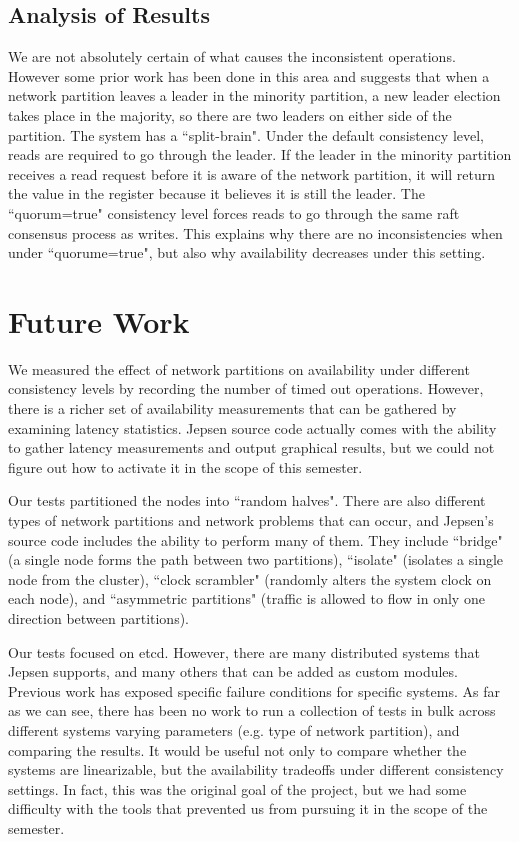 \documentclass[12pt,conference]{IEEEtran}
\begin{document}
\subsection{Analysis of Results}

We are not absolutely certain of what causes the inconsistent operations. However some prior work\cite{jepsenetcd} has been done in this area and suggests that when a network partition leaves a leader in the minority partition, a new leader election takes place in the majority, so there are two leaders on either side of the partition. The system has a ``split-brain". Under the default consistency level, reads are required to go through the leader. If the leader in the minority partition receives a read request before it is aware of the network partition, it will return the value in the register because it believes it is still the leader. The ``quorum=true" consistency level forces reads to go through the same raft consensus process as writes. This explains why there are no inconsistencies when under ``quorume=true", but also why availability decreases under this setting.

\section{Future Work}

We measured the effect of network partitions on availability under different consistency levels by recording the number of timed out operations. However, there is a richer set of availability measurements that can be gathered by examining latency statistics. Jepsen source code actually comes with the ability to gather latency measurements and output graphical results, but we could not figure out how to activate it in the scope of this semester.

Our tests partitioned the nodes into ``random halves". There are also different types of network partitions and network problems that can occur, and Jepsen's source code includes the ability to perform many of them. They include ``bridge" (a single node forms the path between two partitions), ``isolate" (isolates a single node from the cluster), ``clock scrambler" (randomly alters the system clock on each node), and ``asymmetric partitions" (traffic is allowed to flow in only one direction between partitions).

Our tests focused on etcd. However, there are many distributed systems that Jepsen supports, and many others that can be added as custom modules. Previous work has exposed specific failure conditions for specific systems. As far as we can see, there has been no work to run a collection of tests in bulk across different systems varying parameters (e.g. type of network partition), and comparing the results. It would be useful not only to compare whether the systems are linearizable, but the availability tradeoffs under different consistency settings. In fact, this was the original goal of the project, but we had some difficulty with the tools that prevented us from pursuing it in the scope of the semester.
\end{document}
